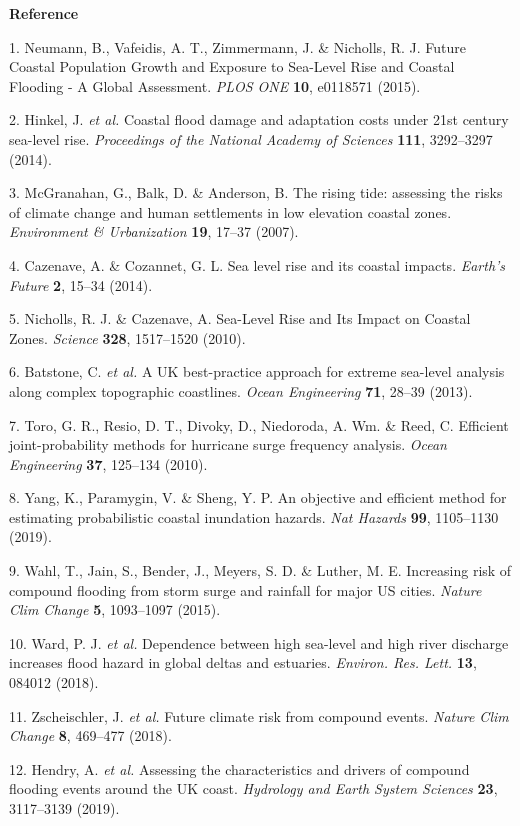 \documentclass[
]{article}
\begin{document}
\textbf{Reference}

1. Neumann, B., Vafeidis, A. T., Zimmermann, J. \& Nicholls, R. J.
Future Coastal Population Growth and Exposure to Sea-Level Rise and
Coastal Flooding - A Global Assessment. \emph{PLOS ONE} \textbf{10},
e0118571 (2015).

2. Hinkel, J. \emph{et al.} Coastal flood damage and adaptation costs
under 21st century sea-level rise. \emph{Proceedings of the National
Academy of Sciences} \textbf{111}, 3292--3297 (2014).

3. McGranahan, G., Balk, D. \& Anderson, B. The rising tide: assessing
the risks of climate change and human settlements in low elevation
coastal zones. \emph{Environment \& Urbanization} \textbf{19}, 17--37
(2007).

4. Cazenave, A. \& Cozannet, G. L. Sea level rise and its coastal
impacts. \emph{Earth's Future} \textbf{2}, 15--34 (2014).

5. Nicholls, R. J. \& Cazenave, A. Sea-Level Rise and Its Impact on
Coastal Zones. \emph{Science} \textbf{328}, 1517--1520 (2010).

6. Batstone, C. \emph{et al.} A UK best-practice approach for extreme
sea-level analysis along complex topographic coastlines. \emph{Ocean
Engineering} \textbf{71}, 28--39 (2013).

7. Toro, G. R., Resio, D. T., Divoky, D., Niedoroda, A. Wm. \& Reed, C.
Efficient joint-probability methods for hurricane surge frequency
analysis. \emph{Ocean Engineering} \textbf{37}, 125--134 (2010).

8. Yang, K., Paramygin, V. \& Sheng, Y. P. An objective and efficient
method for estimating probabilistic coastal inundation hazards.
\emph{Nat Hazards} \textbf{99}, 1105--1130 (2019).

9. Wahl, T., Jain, S., Bender, J., Meyers, S. D. \& Luther, M. E.
Increasing risk of compound flooding from storm surge and rainfall for
major US cities. \emph{Nature Clim Change} \textbf{5}, 1093--1097
(2015).

10. Ward, P. J. \emph{et al.} Dependence between high sea-level and high
river discharge increases flood hazard in global deltas and estuaries.
\emph{Environ. Res. Lett.} \textbf{13}, 084012 (2018).

11. Zscheischler, J. \emph{et al.} Future climate risk from compound
events. \emph{Nature Clim Change} \textbf{8}, 469--477 (2018).

12. Hendry, A. \emph{et al.} Assessing the characteristics and drivers
of compound flooding events around the UK coast. \emph{Hydrology and
Earth System Sciences} \textbf{23}, 3117--3139 (2019).
\end{document}
